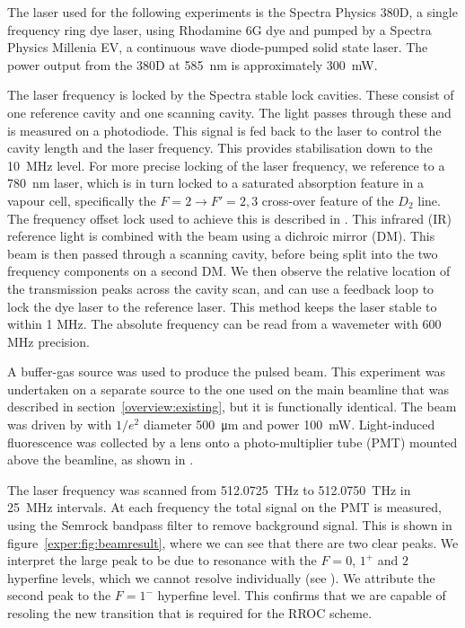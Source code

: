 The  laser used for the following experiments is the Spectra
Physics 380D, a single frequency ring dye laser, using Rhodamine 6G dye and
pumped by a Spectra Physics Millenia EV, a continuous wave diode-pumped solid
state laser. The power output from the 380D at \SI{585}{\nano\meter} is
approximately \SI{300}{\milli\watt}.

The laser frequency is locked by the Spectra stable lock cavities. These
consist of one reference cavity and one scanning cavity. The light passes
through these and is measured on a photodiode. This signal is fed back to the
laser to control the cavity length and the laser frequency. This provides
stabilisation down to the \SI{10}{\mega\hertz} level. For more precise locking
of the laser frequency, we reference  to a \SI{780}{\nano\meter}
laser, which is in turn locked to a saturated absorption feature in a \Rb{}
vapour cell, specifically the $F=2 \rightarrow F'=2, 3$ cross-over feature of
the \esRb{} $D_2$ line. The frequency offset lock used to achieve this is
described in . This infrared (IR) reference light is
combined with the  beam using  a dichroic mirror (DM). This beam
is then passed through a scanning cavity, before being split into the two
frequency components on a second DM. We then observe the relative location of
the transmission peaks across the cavity scan, and can use a feedback loop to
lock the dye laser to the reference laser.
%
This method keeps the laser stable to within 1 MHz. The absolute frequency can
be read from a wavemeter with 600 MHz precision.

A buffer-gas source  was used to produce the pulsed \CaF{} beam.  This
experiment was undertaken on a separate \CaF{} source to the one used on the
main beamline that was described in section~\ref{overview:existing}, but it is
functionally identical.  The beam was driven by  with $1/e^2$
diameter \SI{500}{\micro\meter} and power \SI{100}{\milli\watt}.  Light-induced
fluorescence was collected by a lens onto a photo-multiplier tube (PMT) mounted
above the beamline, as shown in .

The laser frequency was scanned from \SI{512.0725}{\tera\hertz} to
\SI{512.0750}{\tera\hertz} in \SI{25}{\mega\hertz} intervals. At each frequency
the total signal on the PMT is measured, using the Semrock bandpass filter to
remove background signal. This is shown in figure~\ref{exper:fig:beamresult},
where we can see that there are two clear peaks. We interpret the large peak to
be due to resonance with the $F=0$, $1^+$ and $2$ hyperfine levels, which we
cannot resolve individually (see ). We
attribute the second peak to the $F=1^-$ hyperfine level. This confirms that we
are capable of resoling the new transition that is required for the RROC
scheme.

